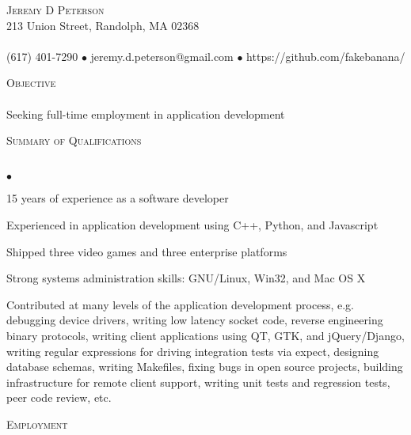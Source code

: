 \documentclass{article}
\newcommand{\lineunder}{\vspace*{-8pt} \\ \hspace*{-18pt} \hrulefill \\}
\newcommand{\header}[1]{{\hspace*{-15pt}\vspace*{6pt} \textsc{#1}} \vspace*{-6pt} \lineunder}
\newcommand{\contact}[3]{
\vspace*{-8pt}
\begin{center}
{\LARGE \scshape {#1}}\\
#2 \lineunder 
#3
\end{center}
\vspace*{-8pt}
}
\newcommand{\objective}[1]{{ #1\vspace*{8pt} }}
\newenvironment{achievements}{\begin{list}{$\bullet$}{\topsep 0pt \itemsep -2pt}}{\vspace*{4pt}\end{list}}
\begin{document}
\small
\smallskip
\vspace*{-44pt}

\contact{Jeremy D Peterson}
{213 Union Street, Randolph, MA 02368}
{(617) 401-7290 $\bullet$ jeremy.d.peterson@gmail.com  $\bullet$ https://github.com/fakebanana/ }

\header{Objective}
\objective {Seeking full-time employment in application development}

\header{Summary of Qualifications}
\begin{achievements}
\item 15 years of experience as a software developer
\item Experienced in application development using C++, Python, and Javascript
\item Shipped three video games and three enterprise platforms
\item Strong systems administration skills: GNU/Linux, Win32, and Mac OS X
\item Contributed at many levels of the application development process, e.g. debugging device drivers, writing low latency socket code, reverse engineering binary protocols, writing client applications using QT, GTK, and jQuery/Django, writing regular expressions for driving integration tests via expect, designing database schemas, writing Makefiles, fixing bugs in open source projects, building infrastructure for remote client support, writing unit tests and regression tests, peer code review, etc.
\end{achievements}

\header{Employment}
\end{document}
